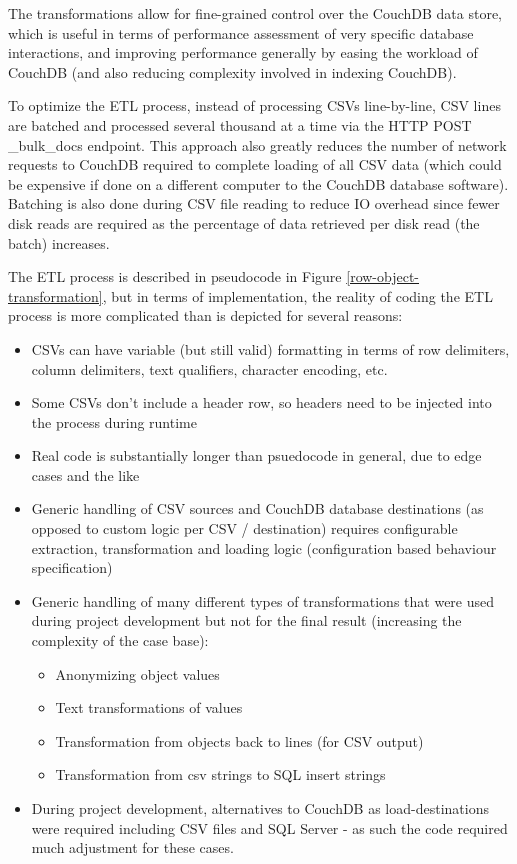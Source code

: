 The transformations allow for fine-grained control over the CouchDB data store, which is useful in terms of performance assessment of very specific database interactions, and improving performance generally by easing the workload of CouchDB (and also reducing complexity involved in indexing CouchDB).

To optimize the ETL process, instead of processing CSVs line-by-line, CSV lines are batched and processed several thousand at a time via the HTTP POST \_bulk\_docs endpoint. This approach also greatly reduces the number of network requests to CouchDB required to complete loading of all CSV data (which could be expensive if done on a different computer to the CouchDB database software). Batching is also done during CSV file reading to reduce IO overhead since fewer disk reads are required as the percentage of data retrieved per disk read (the batch) increases.

The ETL process is described in pseudocode in Figure \ref{row-object-transformation}, but in terms of implementation, the reality of coding the ETL process is more complicated than is depicted for several reasons:

\begin{itemize}
  \item CSVs can have variable (but still valid) formatting in terms of row delimiters, column delimiters, text qualifiers, character encoding, etc.
  \item Some CSVs don't include a header row, so headers need to be injected into the process during runtime
  \item Real code is substantially longer than psuedocode in general, due to edge cases and the like
  \item Generic handling of CSV sources and CouchDB database destinations (as opposed to custom logic per CSV / destination) requires configurable extraction, transformation and loading logic (configuration based behaviour specification)
  \item Generic handling of many different types of transformations that were used during project development but not for the final result (increasing the complexity of the case base):
        \begin{itemize}
          \item Anonymizing object values
          \item Text transformations of values
          \item Transformation from objects back to lines (for CSV output)
          \item Transformation from csv strings to SQL insert strings
        \end{itemize}
  \item During project development, alternatives to CouchDB as load-destinations were required including CSV files and SQL Server - as such the code required much adjustment for these cases.
\end{itemize}

